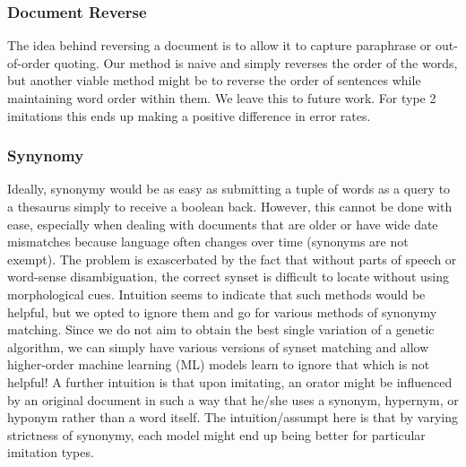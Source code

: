 
\subsubsection{Document Reverse}
The idea behind reversing a document is to allow it to capture paraphrase or out-of-order quoting. Our method is naive and simply reverses the order of the words, but another viable method might be to reverse the order of sentences while maintaining word order within them. We leave this to future work. For type 2 imitations this ends up making a positive difference in error rates.



\subsubsection{Synynomy}
Ideally, synonymy would be as easy as submitting a tuple of words as a query to a thesaurus simply to receive a boolean back. However, this cannot be done with ease, especially when dealing with documents that are older or have wide date mismatches because language often changes over time (synonyms are not exempt). The problem is exascerbated by the fact that without parts of speech or word-sense disambiguation, the correct synset is difficult to locate without using morphological cues. Intuition seems to indicate that such methods would be helpful, but we opted to ignore them and go for various methods of synonymy matching. Since we do not aim to obtain the best single variation of a genetic algorithm, we can simply have various versions of synset matching and allow higher-order machine learning (ML) models learn to ignore that which is not helpful! A further intuition is that upon imitating, an orator might be influenced by an original document in such a way that he/she uses a synonym, hypernym, or hyponym rather than a word itself. The intuition/assumpt here is that by varying strictness of synonymy, each model might end up being better for particular imitation types.

